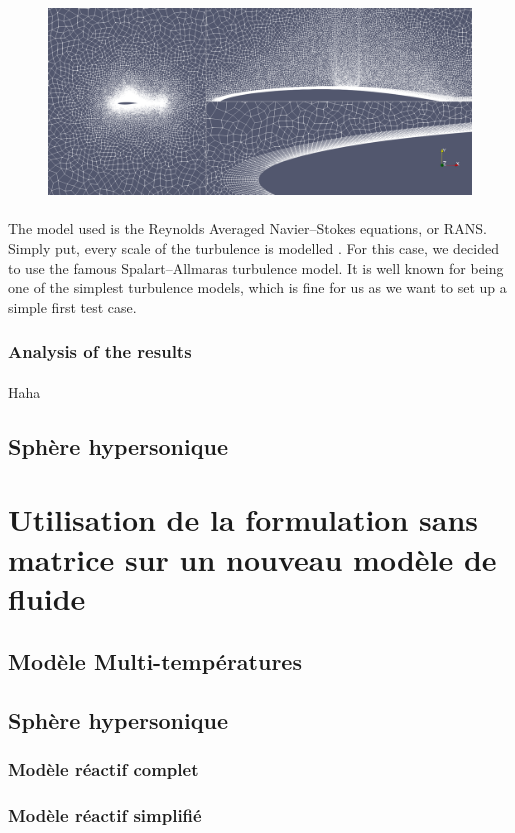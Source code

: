         \begin{figure}
          \includegraphics[width=\textwidth]{figures/rae_mesh.png}
          \caption{}
          \label{fig:rae_mesh}
        \end{figure}

        \paragraph{}
        The model used is the Reynolds Averaged Navier--Stokes equations, or RANS.
        Simply put, every scale of the turbulence is modelled .
        For this case, we decided to use the famous Spalart--Allmaras turbulence model.
        It is well known for being one of the simplest turbulence models, which is fine for us as we want to set up a simple first test case.

        \paragraph{}


      \subsubsection{Analysis of the results}


        \paragraph{}
        Haha




    \subsection{Sphère hypersonique}


  \section{Utilisation de la formulation sans matrice sur un nouveau modèle de fluide}
    \subsection{Modèle Multi-températures}
    \subsection{Sphère hypersonique}
      \subsubsection{Modèle réactif complet}
      \subsubsection{Modèle réactif simplifié}
